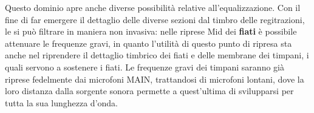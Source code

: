 Questo dominio apre anche diverse possibilità relative all'equalizzazione.
Con il fine di far emergere il dettaglio delle diverse sezioni dal timbro delle regitrazioni, le si può filtrare in maniera non invasiva: nelle riprese Mid dei \textbf{fiati} è possibile attenuare le frequenze gravi, in quanto l'utilità di questo punto di ripresa sta anche nel riprendere il dettaglio timbrico dei fiati e delle membrane dei timpani, i quali servono a sostenere i fiati. Le frequenze gravi dei timpani saranno già riprese fedelmente dai microfoni MAIN, trattandosi di microfoni lontani, dove la loro distanza dalla sorgente sonora permette a quest'ultima di svilupparsi per tutta la sua lunghezza d'onda.


\vfill\null

\newpage %


\vfill\null

\raggedright
%



